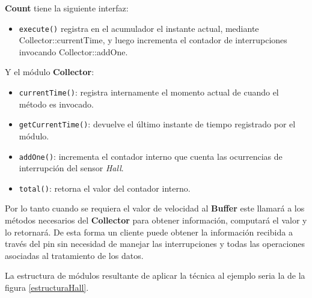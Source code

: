 \textbf{Count} tiene la siguiente interfaz:
\begin{itemize}
    \item \verb|execute()| registra en el acumulador el instante actual, mediante Collector::currentTime, y luego incrementa el contador de interrupciones invocando Collector::addOne.
\end{itemize}

Y el módulo \textbf{Collector}:
\begin{itemize}
    \item \verb|currentTime()|: registra internamente el momento actual de cuando el método es invocado.
    \item \verb|getCurrentTime()|: devuelve el último instante de tiempo registrado por el módulo.
    \item \verb|addOne()|: incrementa el contador interno que cuenta las ocurrencias de interrupción del sensor \textit{Hall}.
    \item \verb|total()|: retorna el valor del contador interno.
\end{itemize}

Por lo tanto cuando se requiera el valor de velocidad al \textbf{Buffer} este llamará a los métodos necesarios del \textbf{Collector} para obtener información, computará el valor y lo retornará. De esta forma un cliente puede obtener la información recibida a través del pin sin necesidad de manejar las interrupciones y todas las operaciones asociadas al tratamiento de los datos.

La estructura de módulos resultante de aplicar la técnica al ejemplo seria la de la figura \ref{estructuraHall}.

